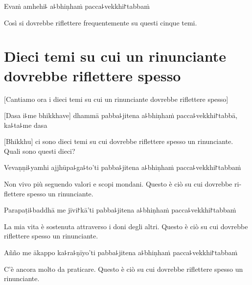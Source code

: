 Evaṁ amhehi꜕ a꜕bhiṇhaṁ pacca꜕vekkhi꜓tabbaṁ


\begin{english}
  Così si dovrebbe riflettere frequentemente su questi cinque temi.
\end{english}

\chapter[Dieci temi]{Dieci temi su cui un rinunciante dovrebbe riflettere spesso}


\enlargethispage{\baselineskip}

\begin{leader}
\end{leader}

\begin{english}
  [Cantiamo ora i dieci temi su cui un rinunciante dovrebbe riflettere spesso]
\end{english}


[Dasa i꜕me bhikkhave] dhammā pabba꜕jitena a꜕bhiṇhaṁ pacca꜕vekkhi꜓tabbā, ka꜕ta꜕me dasa

\begin{english}
[Bhikkhu] ci sono dieci temi su cui dovrebbe riflettere spesso un rinunciante.
Quali sono questi dieci?
\end{english}

Vevaṇṇi꜕yamhi ajjhūpa꜕ga꜕to'ti pabba꜕jitena a꜕bhiṇhaṁ pacca꜕vekkhi꜓tabbaṁ

\begin{english}
 Non vivo più seguendo valori e scopi mondani.
 Questo è ciò su cui dovrebbe riflettere spesso un rinunciante.
\end{english}

Parapaṭi꜕baddhā me jīvi꜓kā'ti pabba꜕jitena a꜕bhiṇhaṁ pacca꜕vekkhi꜓tabbaṁ

\begin{english}
 La mia vita è sostenuta attraverso i doni degli altri.
Questo è ciò su cui dovrebbe riflettere spesso un rinunciante.
\end{english}

Añño me ākappo ka꜕ra꜕ṇīyo'ti pabba꜕jitena a꜕bhiṇhaṁ pacca꜕vekkhi꜓tabbaṁ

\begin{english}
C'è ancora molto da praticare.
Questo è ciò su cui dovrebbe riflettere spesso un rinunciante.
\end{english}

